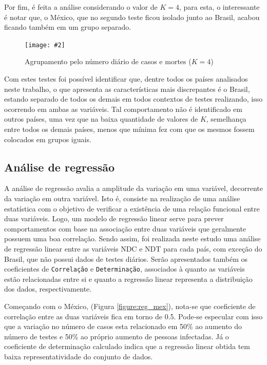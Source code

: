 \documentclass[a4paper,12pt]{article}
\newcommand{\image}[4]{
    \begin{figure}[H]%
        \begin{center}
        \caption{#3}
        \texttt{[image: \#2]}
        \label{#4}
        \end{center}
    \end{figure}
}
\begin{document}
\par Por fim, é feita a análise considerando o valor de $K = 4$, para esta, o interessante é notar que, o México, que no segundo teste ficou isolado junto ao Brasil, acabou ficando também em um grupo separado.

\image{0.9}{images/analise_de_agrupamento/2_grupos_k4_ndc-e-ndm.png}{Agrupamento pelo número diário de casos e mortes ($K = 4$)}{figure:group_ndcndm3}

\par Com estes testes foi possível identificar que, dentre todos os países analisados neste trabalho, o que apresenta as características mais discrepantes é o Brasil, estando separado de todos os demais em todos contextos de testes realizando, isso ocorrendo em ambas as variáveis. Tal comportamento não é identificado em outros países, uma vez que na baixa quantidade de valores de $K$, semelhança entre todos os demais países, menos que mínima fez com que os mesmos fossem colocados em grupos iguais.

\subsection{Análise de regressão}

\par A análise de regressão avalia a amplitude da variação em uma variável, decorrente da variação em outra variável. Isto é, consiste na realização de uma análise estatística com o objetivo de verificar a existência de uma relação funcional entre duas variáveis. Logo, um modelo de regressão linear serve para prever comportamentos com base na associação entre duas variáveis que geralmente possuem uma boa correlação. Sendo assim, foi realizada neste estudo uma análise de regressão linear entre as variáveis NDC e NDT para cada país, com exceção do Brasil, que não possui dados de testes diários. Serão apresentados também os coeficientes de  \texttt{Correlação} e \texttt{Determinação}, associados à quanto as variáveis estão relacionadas entre si e quanto a regressão linear representa a distribuição dos dados, respectivamente. 

\par Começando com o México, (Figura \ref{figure:reg_mex}), nota-se que coeficiente de correlação entre as duas variáveis fica em torno de 0.5. Pode-se especular com isso que a variação no número de casos esta relacionado em 50\% ao aumento do número de testes e 50\% ao próprio aumento de pessoas infectadas. Já o coeficiente de determinação calculado indica que a regressão linear obtida tem baixa representatividade do conjunto de dados. 
\end{document}

